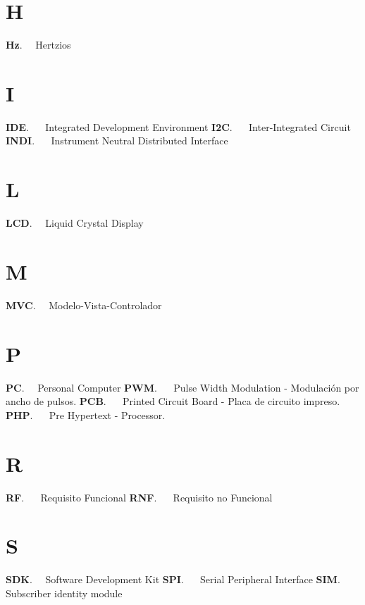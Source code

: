 {
	\section*{H}
}
\noindent 
\textbf{Hz}. \ \ Hertzios

{
	\section*{I}
}
\noindent 
\textbf{IDE}. \ \ \label{IDE} Integrated Development Environment
\newline
\textbf{I2C}. \ \ \label{I2C} Inter-Integrated Circuit
\newline
\textbf{INDI}. \ \ \label{INDI} Instrument Neutral Distributed Interface




{
	\section*{L}
}

\noindent 
\textbf{LCD}. \label{LCD} \ \ Liquid Crystal Display

{
	\section*{M}
}
\noindent 
\textbf{MVC}. \ \ Modelo-Vista-Controlador


{
	\section*{P}
}
\noindent 
\textbf{PC}. \ \ Personal Computer
\newline
\textbf{PWM}. \ \ \label{PWM} Pulse Width Modulation - Modulación por ancho de pulsos.
\newline
\textbf{PCB}. \ \ \label{PCB} Printed Circuit Board - Placa de circuito impreso.
\newline
\textbf{PHP}. \ \ \label{PHP} Pre Hypertext - Processor.





{
	\section*{R}
}
\noindent 
\textbf{RF}. \ \ \label{RF} Requisito Funcional
\newline
\textbf{RNF}. \ \ \label{RNF} Requisito no Funcional

{
	\section*{S}
}
\noindent 
\textbf{SDK}. \ \ Software Development Kit
\newline
\textbf{SPI}. \ \ \label{SPI} Serial Peripheral Interface
\newline
\textbf{SIM}. \ \ \label{SIM}  Subscriber identity module


